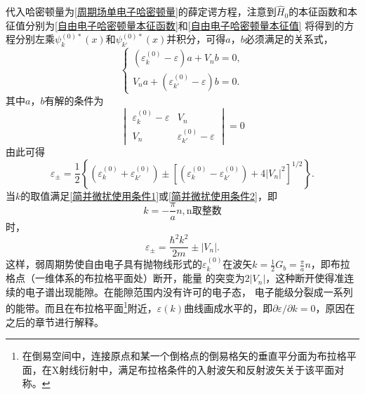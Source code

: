             代入哈密顿量为\autoref{周期场单电子哈密顿量}的薛定谔方程，注意到$\hat{H}_0$的本征函数和本征值分别为\autoref{自由电子哈密顿量本征函数}和\autoref{自由电子哈密顿量本征值}
            将得到的方程分别左乘$\psi_k^{(0)*}(x)$和$\psi_{k‘}^{(0)*}(x)$并积分，可得$a$，$b$必须满足的关系式，
            \begin{equation}
                \left\{ 
                    \begin{aligned}
                        (\varepsilon_k^{(0)}-\varepsilon)a+V_nb=0,\\
                        V_na+(\varepsilon_{k'}^{(0)}-\varepsilon)b=0.
                    \end{aligned}\right.
            \end{equation}
            其中$a$，$b$有解的条件为
            \begin{equation}
                \begin{vmatrix}
                    \varepsilon_k^{(0)}-\varepsilon&V_n\\
                    V_n&\varepsilon_{k'}^{(0)}-\varepsilon
                \end{vmatrix}=0\label{一维简并情况久期方程}
            \end{equation}
            由此可得
            \begin{equation}
                \varepsilon_{\pm}=\frac{1}{2}\left\{ ( \varepsilon_k^{(0)}+\varepsilon_{k'}^{(0)})\pm\left[ (\varepsilon_k^{(0)}-\varepsilon_{k'}^{(0)} )+4\left|V_n\right|^2 \right]^{1/2}\right\}.
            \end{equation}
            当$k$的取值满足\autoref{简并微扰使用条件1}或\autoref{简并微扰使用条件2}，即
            \begin{equation}
                k=-\frac{\pi}{a}n,\text{n取整数}
            \end{equation}
            时，
            \begin{equation}
                \varepsilon_{\pm}=\frac{\hbar^2k^2}{2m}\pm|V_n|.
            \end{equation}
            这样，弱周期势使自由电子具有抛物线形式的$\varepsilon_k^{(0)}$在波矢$k=\frac{1}{2}G_b=\frac{\pi}{a}n$，即布拉格点（一维体系的布拉格平面处）断开，能量
            的突变为$2|V_n|$，这种断开使得准连续的电子谱出现能隙。在能隙范围内没有许可的电子态，
            电子能级分裂成一系列的能带。而且在布拉格平面\footnote{在倒易空间中，连接原点和某一个倒格点的倒易格矢的垂直平分面为布拉格平面，在X射线衍射中，满足布拉格条件的入射波矢和反射波矢关于该平面对称。}附近，$\varepsilon(k)$曲线画成水平的，即$\partial \varepsilon/\partial k=0$，原因在之后的章节进行解释。
            
